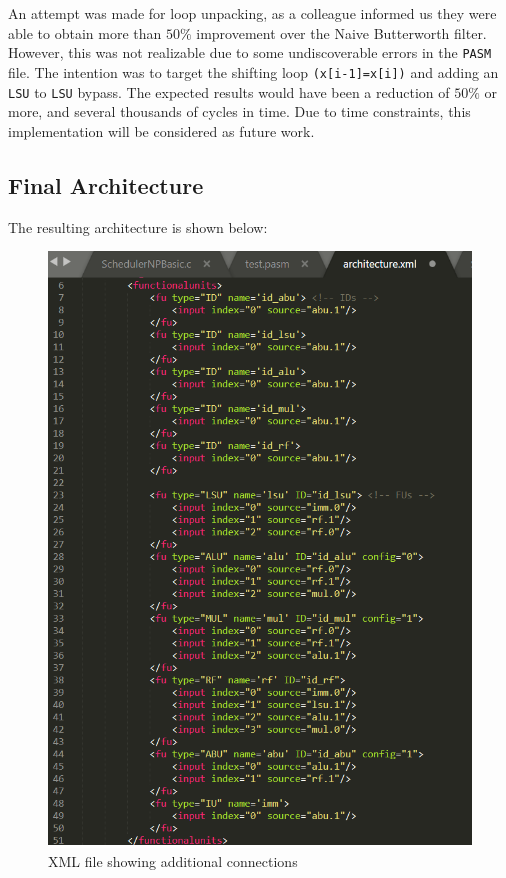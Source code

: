 \documentclass[letterpaper, 10 pt, conference]{ieeeconf}  %
\begin{document}
An attempt was made for loop unpacking, as a colleague informed us they were able to obtain more than $50\%$ improvement over the Naive Butterworth filter. However, this was not realizable due to some undiscoverable errors in the \texttt{PASM} file. The intention was to target the shifting loop \texttt{(x[i-1]=x[i])} and adding an \texttt{LSU} to \texttt{LSU} bypass. The expected results would have been a reduction of $50\%$ or more, and several thousands of cycles in time. Due to time constraints, this implementation will be considered as future work.  

\subsection{Final Architecture}
\label{imp:E}

The resulting architecture is shown below:

\begin{figure}[h]
\begin{center}
\includegraphics[scale=0.35]{images/arch01.png}
\caption{XML file showing additional connections}
\label{fig:TODO1}
\end{center}
\end{figure}
\end{document}

